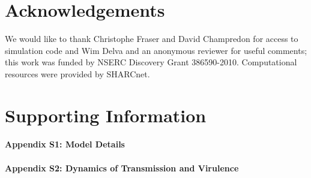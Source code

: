 \documentclass[10pt,letterpaper]{article}
\begin{document}
\section*{Acknowledgements}
We would like to thank Christophe Fraser and
David Champredon for access to simulation code
and Wim Delva and an anonymous reviewer for useful comments;
this work was funded by NSERC Discovery Grant 386590-2010.
Computational resources were provided by SHARCnet.

\section*{Supporting Information}

\paragraph*{Appendix S1: Model Details}
\label{S1_Appendix}

\paragraph*{Appendix S2: Dynamics of Transmission and Virulence}

\label{S2_Appendix}

\clearpage

\nolinenumbers

%
%
% 
\end{document}
